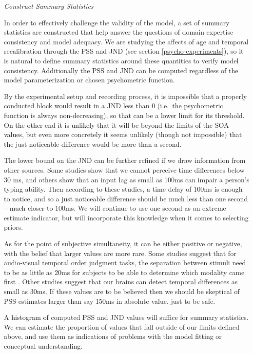 \documentclass[11pt, oneside, openany]{scrbook}
\begin{document}
\emph{Construct Summary Statistics}

In order to effectively challenge the validity of the model, a set of summary statistics are constructed that help answer the questions of domain expertise consistency and model adequacy. We are studying the affects of age and temporal recalibration through the PSS and JND (see section \ref{psycho-experiments}), so it is natural to define summary statistics around these quantities to verify model consistency. Additionally the PSS and JND can be computed regardless of the model parameterization or chosen psychometric function.

By the experimental setup and recording process, it is impossible that a properly conducted block would result in a JND less than 0 (i.e.~the psychometric function is always non-decreasing), so that can be a lower limit for its threshold. On the other end it is unlikely that it will be beyond the limits of the SOA values, but even more concretely it seems unlikely (though not impossible) that the just noticeable difference would be more than a second.

The lower bound on the JND can be further refined if we draw information from other sources. Some studies show that we cannot perceive time differences below 30 ms, and others show that an input lag as small as 100ms can impair a person's typing ability. Then according to these studies, a time delay of 100ms is enough to notice, and so a just noticeable difference should be much less than one second -- much closer to 100ms. We will continue to use one second as an extreme estimate indicator, but will incorporate this knowledge when it comes to selecting priors.

As for the point of subjective simultaneity, it can be either positive or negative, with the belief that larger values are more rare. Some studies suggest that for audio-visual temporal order judgment tasks, the separation between stimuli need to be as little as 20ms for subjects to be able to determine which modality came first \citep{vatakis2007influence}. Other studies suggest that our brains can detect temporal differences as small as 30ms. If these values are to be believed then we should be skeptical of PSS estimates larger than say 150ms in absolute value, just to be safe.

A histogram of computed PSS and JND values will suffice for summary statistics. We can estimate the proportion of values that fall outside of our limits defined above, and use them as indications of problems with the model fitting or conceptual understanding.
\end{document}
